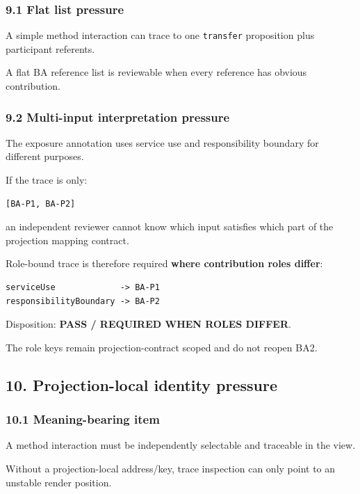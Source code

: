 \documentclass[11pt,a4paper]{article}
\begin{document}
\subsubsection{9.1 Flat list pressure}\label{91-flat-list-pressure}

A simple method interaction can trace to one \texttt{transfer} proposition plus participant referents.

A flat BA reference list is reviewable when every reference has obvious contribution.

\subsubsection{9.2 Multi-input interpretation pressure}\label{92-multi-input-interpretation-pressure}

The exposure annotation uses service use and responsibility boundary for different purposes.

If the trace is only:

\begin{verbatim}
[BA-P1, BA-P2]
\end{verbatim}

an independent reviewer cannot know which input satisfies which part of the projection mapping contract.

Role-bound trace is therefore required \textbf{where contribution roles differ}:

\begin{verbatim}
serviceUse             -> BA-P1
responsibilityBoundary -> BA-P2
\end{verbatim}

Disposition: \textbf{PASS / REQUIRED WHEN ROLES DIFFER}.

The role keys remain projection-contract scoped and do not reopen BA2.

\subsection{10. Projection-local identity pressure}\label{10-projection-local-identity-pressure}

\subsubsection{10.1 Meaning-bearing item}\label{101-meaning-bearing-item}

A method interaction must be independently selectable and traceable in the view.

Without a projection-local address/key, trace inspection can only point to an unstable render position.
\end{document}
